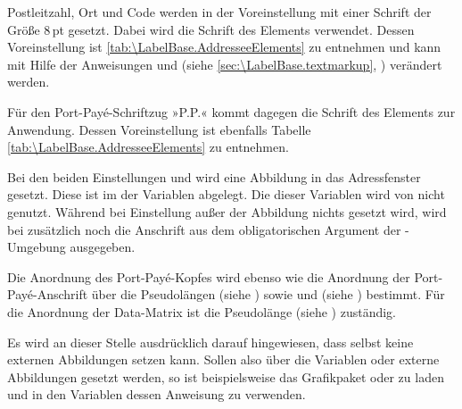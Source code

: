 \BeginIndexGroup
{}
Postleitzahl, Ort und Code werden in der
Voreinstellung mit einer Schrift der Größe 8\,pt gesetzt. Dabei wird die
Schrift des Elements %
 verwendet. Dessen Voreinstellung ist
\autoref{tab:\LabelBase.AddresseeElements} zu entnehmen und kann mit Hilfe der
Anweisungen  und
 (siehe
\autoref{sec:\LabelBase.textmarkup}, )
verändert werden.%
\EndIndexGroup

\BeginIndexGroup
{}
Für den Port-Payé-Schriftzug »P.P.« kommt dagegen die Schrift des Elements
 zur Anwendung. Dessen
Voreinstellung ist ebenfalls Tabelle
\autoref{tab:\LabelBase.AddresseeElements} zu entnehmen.%
\EndIndexGroup

Bei den beiden Einstellungen
und  wird eine Abbildung in das Adressfenster
gesetzt. Diese ist im  der Variablen 
abgelegt. Die  dieser Variablen wird von \KOMAScript{}
nicht genutzt. Während bei Einstellung  außer der
Abbildung nichts gesetzt wird, wird bei
 zusätzlich noch die Anschrift aus dem
obligatorischen Argument der -Umgebung
ausgegeben.

Die Anordnung des Port-Payé-Kopfes wird ebenso wie die Anordnung der
Port-Payé-Anschrift über die Pseudolängen
 (siehe
) sowie
 und
 (siehe
) bestimmt. Für die Anordnung der
Data-Matrix ist die Pseudolänge 
(siehe ) zuständig.

Es wird an dieser Stelle ausdrücklich darauf hingewiesen,
dass \KOMAScript{} selbst keine externen Abbildungen setzen kann. %
\iffalse %
Verwenden Sie für solche Abbildungen beispielsweise das Paket
\Package{graphicx}\IndexPackage{graphicx} und dessen Anweisung
\Macro{includegraphics}.%
\else%
Sollen also über die Variablen  oder
 externe Abbildungen gesetzt werden, so ist
beispielsweise das Grafikpaket  oder
 zu laden und in den Variablen dessen
Anweisung  zu verwenden.%
\fi%
\EndIndexGroup



